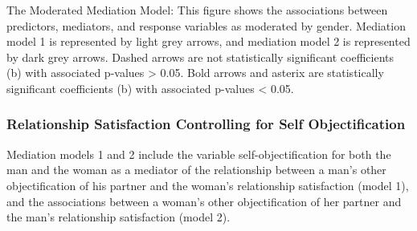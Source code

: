 \documentclass[
  man]{apa6}
\begin{document}
The Moderated Mediation Model: This figure shows the associations between predictors, mediators, and response variables as moderated by gender. Mediation model 1 is represented by light grey arrows, and mediation model 2 is represented by dark grey arrows. Dashed arrows are not statistically significant coefficients (b) with associated p-values \textgreater{} 0.05. Bold arrows and asterix are statistically significant coefficients (b) with associated p-values \textless{} 0.05.

\hypertarget{relationship-satisfaction-controlling-for-self-objectification}{%
\subsubsection{Relationship Satisfaction Controlling for Self Objectification}\label{relationship-satisfaction-controlling-for-self-objectification}}

Mediation models 1 and 2 include the variable self-objectification for both the man and the woman as a mediator of the relationship between a man's other objectification of his partner and the woman's relationship satisfaction (model 1), and the associations between a woman's other objectification of her partner and the man's relationship satisfaction (model 2).
\end{document}
